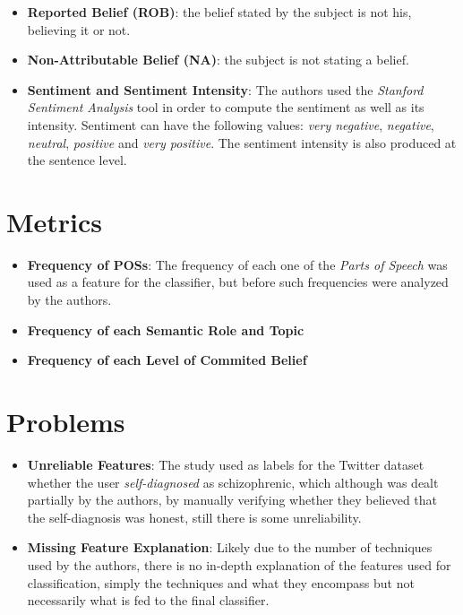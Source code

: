 \documentclass{Paper_Summary}
\begin{document}
\begin{itemize}
\begin{itemize}
            \item \textbf{Reported Belief (ROB)}: the belief stated by the subject is not his, believing it or not.
            \item \textbf{Non-Attributable Belief (NA)}: the subject is not stating a belief.
        \item \textbf{Sentiment and Sentiment Intensity}: The authors used the \emph{Stanford Sentiment Analysis} tool in order to compute the sentiment as well as its intensity. Sentiment can have the following values: \emph{very negative}, \emph{negative}, \emph{neutral}, \emph{positive} and \emph{very positive}. The sentiment intensity is also produced at the sentence level.
        \end{itemize}
    \end{itemize}

\section{Metrics}
    \begin{itemize}
        \item \textbf{Frequency of POSs}: The frequency of each one of the \emph{Parts of Speech} was used as a feature for the classifier, but before such frequencies were analyzed by the authors.
        \item \textbf{Frequency of each Semantic Role and Topic}
        \item \textbf{Frequency of each Level of Commited Belief}
    \end{itemize}

\section{Problems}
    \begin{itemize}
        \item \textbf{Unreliable Features}: The study used as labels for the Twitter dataset whether the user \emph{self-diagnosed} as schizophrenic, which although was dealt partially by the authors, by manually verifying whether they believed that the self-diagnosis was honest, still there is some unreliability.
        \item \textbf{Missing Feature Explanation}: Likely due to the number of techniques used by the authors, there is no in-depth explanation of the features used for classification, simply the techniques and what they encompass but not necessarily what is fed to the final classifier.
    \end{itemize}
\end{document}
